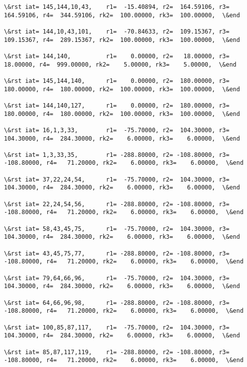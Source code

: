 \documentclass[11pt]{article}
\begin{document}
\begin{Verbatim}[commandchars=\\\{\}]
\&rst iat= 145,144,10,43,    r1=  -15.40894, r2=  164.59106, r3=  164.59106, r4=  344.59106, rk2=  100.00000, rk3=  100.00000,  \&end

\&rst iat= 144,10,43,101,    r1=  -70.84633, r2=  109.15367, r3=  109.15367, r4=  289.15367, rk2=  100.00000, rk3=  100.00000,  \&end

\&rst iat= 144,140,          r1=    0.00000, r2=   18.00000, r3=   18.00000, r4=  999.00000, rk2=    5.00000, rk3=    5.00000,  \&end

\&rst iat= 145,144,140,      r1=    0.00000, r2=  180.00000, r3=  180.00000, r4=  180.00000, rk2=  100.00000, rk3=  100.00000,  \&end

\&rst iat= 144,140,127,      r1=    0.00000, r2=  180.00000, r3=  180.00000, r4=  180.00000, rk2=  100.00000, rk3=  100.00000,  \&end

\&rst iat= 16,1,3,33,        r1=  -75.70000, r2=  104.30000, r3=  104.30000, r4=  284.30000, rk2=    6.00000, rk3=    6.00000,  \&end

\&rst iat= 1,3,33,35,        r1= -288.80000, r2= -108.80000, r3= -108.80000, r4=   71.20000, rk2=    6.00000, rk3=    6.00000,  \&end

\&rst iat= 37,22,24,54,      r1=  -75.70000, r2=  104.30000, r3=  104.30000, r4=  284.30000, rk2=    6.00000, rk3=    6.00000,  \&end

\&rst iat= 22,24,54,56,      r1= -288.80000, r2= -108.80000, r3= -108.80000, r4=   71.20000, rk2=    6.00000, rk3=    6.00000,  \&end

\&rst iat= 58,43,45,75,      r1=  -75.70000, r2=  104.30000, r3=  104.30000, r4=  284.30000, rk2=    6.00000, rk3=    6.00000,  \&end

\&rst iat= 43,45,75,77,      r1= -288.80000, r2= -108.80000, r3= -108.80000, r4=   71.20000, rk2=    6.00000, rk3=    6.00000,  \&end

\&rst iat= 79,64,66,96,      r1=  -75.70000, r2=  104.30000, r3=  104.30000, r4=  284.30000, rk2=    6.00000, rk3=    6.00000,  \&end

\&rst iat= 64,66,96,98,      r1= -288.80000, r2= -108.80000, r3= -108.80000, r4=   71.20000, rk2=    6.00000, rk3=    6.00000,  \&end

\&rst iat= 100,85,87,117,    r1=  -75.70000, r2=  104.30000, r3=  104.30000, r4=  284.30000, rk2=    6.00000, rk3=    6.00000,  \&end

\&rst iat= 85,87,117,119,    r1= -288.80000, r2= -108.80000, r3= -108.80000, r4=   71.20000, rk2=    6.00000, rk3=    6.00000,  \&end


\end{Verbatim}
\end{document}

